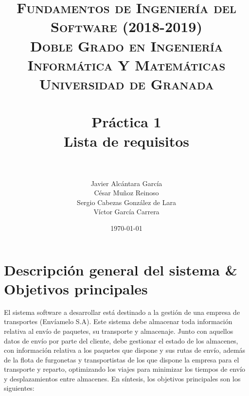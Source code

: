 



\title{	
\normalfont \normalsize 
\textsc{\textbf{Fundamentos de Ingeniería del Software (2018-2019)} \\ Doble Grado en Ingeniería Informática Y Matemáticas \\ Universidad de Granada} \\ [25pt] %
\horrule{0.5pt} \\[0.4cm] %
\huge \textbf{Práctica 1} \\ Lista de requisitos \\ %
\horrule{2pt} \\[0.5cm] %
}

\author{Javier Alcántara García\\ César Muñoz Reinoso \\ Sergio Cabezas González de Lara \\ Víctor García Carrera} %

\date{\normalsize\today} %





\maketitle %

\newpage %

\tableofcontents %


\newpage


\section{Descripción general del sistema \& Objetivos principales}
El sistema software a desarrollar está destinado a la gestión de una empresa de transportes (Envíamelo S.A). Este sistema debe almacenar toda información relativa al envío de paquetes, su transporte y almacenaje. Junto con aquellos datos de envío por parte del cliente, debe gestionar el estado de los almacenes, con información relativa a los paquetes que dispone y sus rutas de envío, además de la flota de furgonetas y transportistas de los que dispone la empresa para el transporte y reparto, optimizando los viajes para minimizar los tiempos de envío y desplazamientos entre almacenes.
En síntesis, los objetivos principales son los siguientes:

